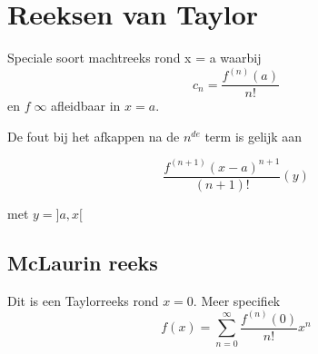 \section{Reeksen van Taylor}
Speciale soort machtreeks rond x = a waarbij
$$c_n = \frac{f^{(n)}(a)}{n!}$$
en $f\;\infty$ afleidbaar in $x = a$.

De fout bij het afkappen na de $n^{de}$ term is gelijk aan 

$$\frac{f^{(n + 1)}(x - a)^{n + 1}}{(n + 1)!} (y)$$

met $y = ]a, x[$
\subsection{McLaurin reeks}
Dit is een Taylorreeks rond $x = 0$. Meer specifiek
$$f(x) = \sum_{n = 0}^{\infty} \frac{f^{(n)}(0)}{n!}x^n$$


